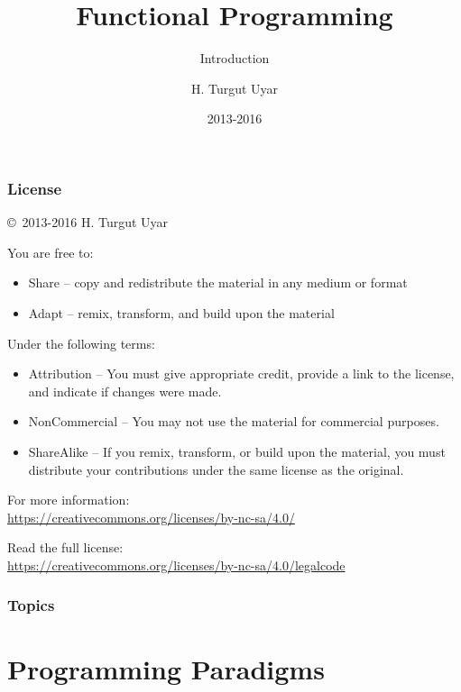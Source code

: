 \documentclass[dvipsnames]{beamer}
\title{Functional Programming}
\subtitle{Introduction}
\author{H. Turgut Uyar}
\date{2013-2016}
\theoremstyle{plain}
\begin{document}
\begin{frame}
  \titlepage
\end{frame}

\begin{frame}
  \frametitle{License}

  \hfill
  \copyright~2013-2016 H. Turgut Uyar

  \vfill
  \begin{footnotesize}
    You are free to:
    \begin{itemize}
      \itemsep0em
      \item Share -- copy and redistribute the material in any medium or format
      \item Adapt -- remix, transform, and build upon the material
    \end{itemize}

    Under the following terms:
    \begin{itemize}
      \itemsep0em
      \item Attribution -- You must give appropriate credit, provide a link to
        the license, and indicate if changes were made.

      \item NonCommercial -- You may not use the material for commercial
        purposes.

      \item ShareAlike -- If you remix, transform, or build upon the material,
        you must distribute your contributions under the same license as the
        original.
    \end{itemize}

    For more information:\\
    \url{https://creativecommons.org/licenses/by-nc-sa/4.0/}

    \smallskip
    Read the full license:\\
    \url{https://creativecommons.org/licenses/by-nc-sa/4.0/legalcode}
  \end{footnotesize}
\end{frame}

\begin{frame}
  \frametitle{Topics}
  \tableofcontents
\end{frame}

\section{Programming Paradigms}

\lstset{language=Python}
\end{document}
